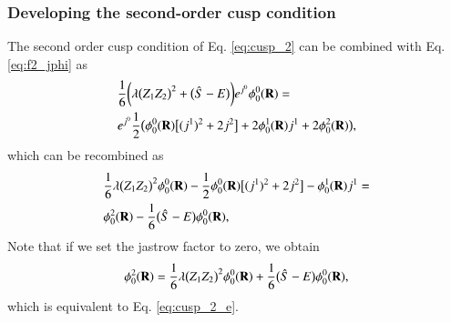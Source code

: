 \documentclass[aip,jcp,reprint,noshowkeys,superscriptaddress]{revtex4-1}
\newcommand{\bd}[1]{{\bf {#1}}}
\begin{document}
\subsubsection{Developing the second-order cusp condition}
The second order cusp condition of Eq. \eqref{eq:cusp_2} can be combined with Eq. \eqref{eq:f2_jphi} as 
\begin{equation}
  \begin{aligned}
& \frac{1}{6}\bigg( \lambda \big(Z_1 Z_2\big)^2  + \big( \hat{S} -E \big)\bigg) e^{j^0}\phi_0^0(\bd{R}) = \\
& e^{j^0}\frac{1}{2}\big(\phi_0^0(\bd{R}) \big[ (j^1)^2 + 2j^2 \big] + 2 \phi_0^1(\bd{R}) j^1 + 2 \phi_0^2(\bd{R}) \big),
  \end{aligned}
\end{equation}
which can be recombined as 
\begin{equation}
  \begin{aligned}
& \frac{1}{6}\lambda \big(Z_1 Z_2\big)^2 \phi_0^0(\bd{R}) - \frac{1}{2}\phi_0^0(\bd{R}) \big[ (j^1)^2 + 2j^2 \big] - \phi_0^1(\bd{R}) j^1  = \\
& \phi_0^2(\bd{R}) - \frac{1}{6}\big( \hat{S} -E \big) \phi_0^0(\bd{R}) ,
  \end{aligned}
\end{equation}
Note that if we set the jastrow factor to zero, we obtain 
\begin{equation}
  \begin{aligned}
 \phi_0^2(\bd{R}) =  \frac{1}{6}\lambda \big(Z_1 Z_2\big)^2 \phi_0^0(\bd{R}) + \frac{1}{6}\big( \hat{S} -E \big) \phi_0^0(\bd{R}),
  \end{aligned}
\end{equation}
which is equivalent to Eq. \eqref{eq:cusp_2_e}. 
\end{document}
